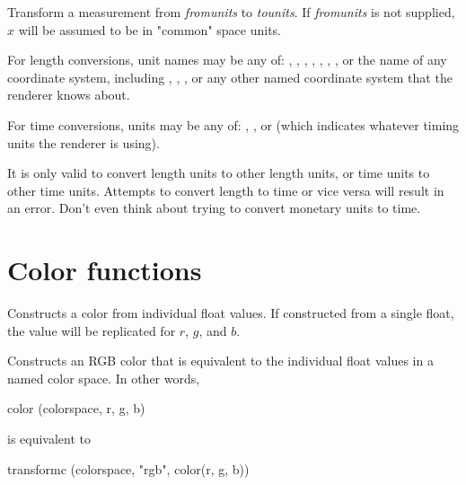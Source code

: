\documentclass[11pt,letterpaper]{book}
\def\color{{\cf color}\xspace}
\def\float{{\cf float}\xspace}
\def\commonspace{{\cf "common"} space\xspace}
\begin{document}
\apiend



Transform a measurement from \emph{fromunits} to \emph{tounits}.  If
\emph{fromunits} is not supplied, $x$ will be assumed to be in
\commonspace units.

For length conversions, unit names may be any of: , ,
, , , , , or the name of any
coordinate system, including , , , or
any other named coordinate system that the renderer knows about.

For time conversions, units may be any of: , , or
 (which indicates whatever timing units the renderer is
using).

It is only valid to convert length units to other length units, or time
units to other time units.  Attempts to convert length to time or vice
versa will result in an error.  Don't even think about trying to convert
monetary units to time.
\apiend



\section{Color functions}
\label{sec:stdlib:color}

Constructs a \color from individual \float values.  If constructed
from a single \float, the value will be replicated for $r$, $g$, and $b$.
\apiend

Constructs an RGB \color that is equivalent to the individual \float values in a
named color space.  In other words,
\begin{code}
    color (colorspace, r, g, b)
\end{code}
\noindent is equivalent to
\begin{code}
    transformc (colorspace, "rgb", color(r, g, b))
\end{code}
\apiend
\end{document}
